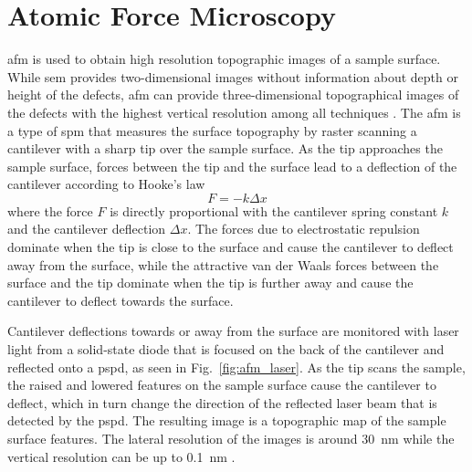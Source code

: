 \section{Atomic Force Microscopy}\label{sec:afm}
\Acf{afm} is used to obtain high resolution topographic images of a sample surface. While \ac{sem} provides two-dimensional images without information about depth or height of the defects, \ac{afm} can provide three-dimensional topographical images of the defects with the highest vertical resolution among all techniques \citep{smith2013industrial}. The \ac{afm} is a type of \ac{spm} that measures the surface topography by raster scanning a cantilever with a sharp tip over the sample surface. As the tip approaches the sample surface, forces between the tip and the surface lead to a deflection of the cantilever according to Hooke's law \citep{bhushan1998handbook}
\begin{equation}
F = -k\Delta x
\end{equation}
where the force $F$ is directly proportional with the cantilever spring constant $k$ and the cantilever deflection $\Delta x$. The forces due to electrostatic repulsion dominate when the tip is close to the surface and cause the cantilever to deflect away from the surface, while the attractive van der Waals forces between the surface and the tip dominate when the tip is further away and cause the cantilever to deflect towards the surface.

Cantilever deflections towards or away from the surface are monitored with laser light from a solid-state diode that is focused on the back of the cantilever and reflected onto a \ac{pspd}, as seen in Fig.~\ref{fig:afm_laser}. As the tip scans the sample, the raised and lowered features on the sample surface cause the cantilever to deflect, which in turn change the direction of the reflected laser beam that is detected by the \ac{pspd}. The resulting image is a topographic map of the sample surface features. The lateral resolution of the images is around \SI{30}{\nano\metre} while the vertical resolution can be up to \SI{0.1}{\nano\metre} \citep{birdi2003scanning}.



